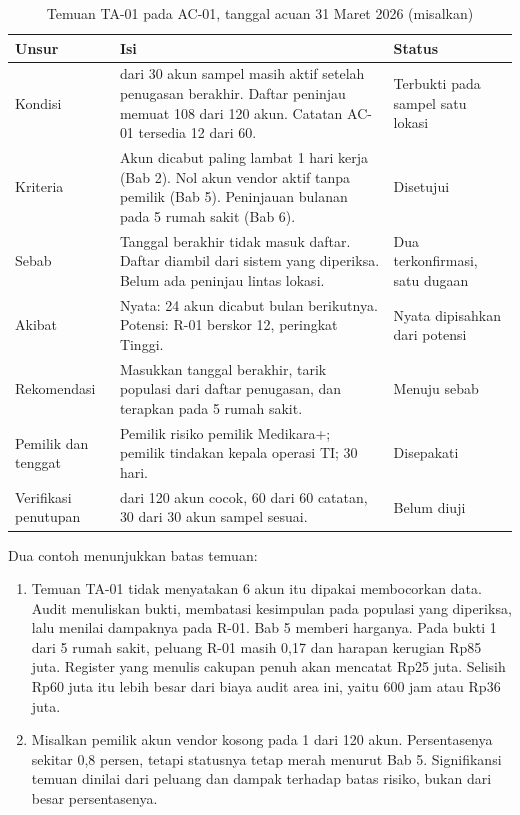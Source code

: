 \begin{table}[!htb]
  \centering\small
  \caption{Temuan TA-01 pada AC-01, tanggal acuan 31 Maret 2026 (misalkan)}\label{tab:ch12-temuan}
  \begin{tabularx}{\textwidth}{|>{\raggedright\arraybackslash}p{}|>{\raggedright\arraybackslash}X|>{\raggedright\arraybackslash}p{}|}
    \hline
    \textbf{Unsur} & \textbf{Isi} & \textbf{Status} \\ \hline
    Kondisi & 6 dari 30 akun sampel masih aktif setelah penugasan berakhir. Daftar peninjau memuat
    108 dari 120 akun. Catatan AC-01 tersedia 12 dari 60. & Terbukti pada sampel satu lokasi \\
    \hline
    Kriteria & Akun dicabut paling lambat 1 hari kerja (Bab 2). Nol akun vendor aktif tanpa pemilik
    (Bab 5). Peninjauan bulanan pada 5 rumah sakit (Bab 6). & Disetujui \\ \hline
    Sebab & Tanggal berakhir tidak masuk daftar. Daftar diambil dari sistem yang diperiksa. Belum
    ada peninjau lintas lokasi. & Dua terkonfirmasi, satu dugaan \\ \hline
    Akibat & Nyata: 24 akun dicabut bulan berikutnya. Potensi: R-01 berskor 12, peringkat Tinggi. &
    Nyata dipisahkan dari potensi \\ \hline
    Rekomendasi & Masukkan tanggal berakhir, tarik populasi dari daftar penugasan, dan terapkan pada
    5 rumah sakit. & Menuju sebab \\ \hline
    Pemilik dan tenggat & Pemilik risiko pemilik Medikara+; pemilik tindakan kepala operasi TI; 30
    hari. & Disepakati \\ \hline
    Verifikasi penutupan & 120 dari 120 akun cocok, 60 dari 60 catatan, 30 dari 30 akun sampel
    sesuai. & Belum diuji \\ \hline
  \end{tabularx}
\end{table}

Dua contoh menunjukkan batas temuan:
\begin{enumerate}
  \item Temuan TA-01 tidak menyatakan 6 akun itu dipakai membocorkan data. Audit menuliskan bukti,
  membatasi kesimpulan pada populasi yang diperiksa, lalu menilai dampaknya pada R-01. Bab 5 memberi
  harganya. Pada bukti 1 dari 5 rumah sakit, peluang R-01 masih 0,17 dan harapan kerugian Rp85
  juta. Register yang menulis cakupan penuh akan mencatat Rp25 juta. Selisih Rp60 juta itu lebih
  besar dari biaya audit area ini, yaitu 600 jam atau Rp36 juta.
  \item Misalkan pemilik akun vendor kosong pada 1 dari 120 akun. Persentasenya sekitar 0,8 persen,
  tetapi statusnya tetap merah menurut Bab 5. Signifikansi temuan dinilai dari peluang dan dampak
  terhadap batas risiko, bukan dari besar persentasenya.
\end{enumerate}


